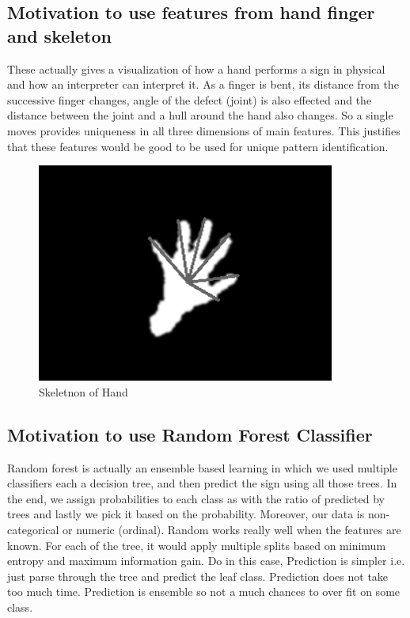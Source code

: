 \subsection{Motivation to use features from hand finger and skeleton}
These actually gives a visualization of how a hand performs a sign in physical and how an interpreter can interpret it. As a finger is bent, its distance from the successive finger changes, angle of the defect (joint) is also effected and the distance between the joint and a hull around the hand also changes. So a single moves provides uniqueness in all three dimensions of main features. This justifies that these features would be good to be used for unique pattern identification. 


\begin{figure}[!htb]
	\begin{center}
		\includegraphics{ThesisFigs/skeletnon}
		\caption{Skeletnon of Hand }\label{fig:Skeletnon of Hand}
	\end{center}
\end{figure}


\subsection{Motivation to use Random Forest Classifier}
Random forest is actually an ensemble based learning in which we used multiple classifiers each a decision tree, and then predict the sign using all those trees. In the end, we assign probabilities to each class as with the ratio of predicted by trees and lastly we pick it based on the probability.
Moreover, our data is non-categorical or numeric (ordinal). Random works really well when the features are known. For each of the tree, it would apply multiple splits based on minimum entropy and maximum information gain.
Do in this case, Prediction is simpler i.e. just parse through the tree and predict the leaf class. Prediction does not take too much time. Prediction is ensemble so not a much chances to over fit on some class.


